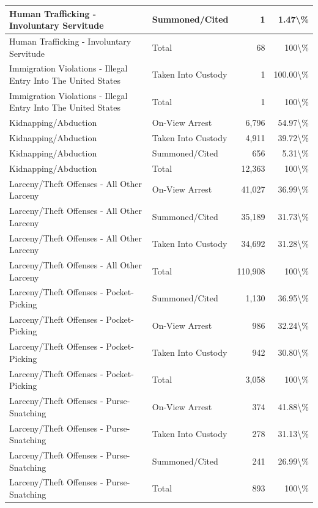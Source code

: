 \documentclass[
]{krantz}
\begin{document}
\begin{longtable}[t]{l|l|r|r}
\hline
Human Trafficking - Involuntary Servitude & Summoned/Cited & 1 & 1.47\textbackslash{}\%\\
\hline
Human Trafficking - Involuntary Servitude & Total & 68 & 100\textbackslash{}\%\\
\hline
Immigration Violations - Illegal Entry Into The United States & Taken Into Custody & 1 & 100.00\textbackslash{}\%\\
\hline
Immigration Violations - Illegal Entry Into The United States & Total & 1 & 100\textbackslash{}\%\\
\hline
Kidnapping/Abduction & On-View Arrest & 6,796 & 54.97\textbackslash{}\%\\
\hline
Kidnapping/Abduction & Taken Into Custody & 4,911 & 39.72\textbackslash{}\%\\
\hline
Kidnapping/Abduction & Summoned/Cited & 656 & 5.31\textbackslash{}\%\\
\hline
Kidnapping/Abduction & Total & 12,363 & 100\textbackslash{}\%\\
\hline
Larceny/Theft Offenses - All Other Larceny & On-View Arrest & 41,027 & 36.99\textbackslash{}\%\\
\hline
Larceny/Theft Offenses - All Other Larceny & Summoned/Cited & 35,189 & 31.73\textbackslash{}\%\\
\hline
Larceny/Theft Offenses - All Other Larceny & Taken Into Custody & 34,692 & 31.28\textbackslash{}\%\\
\hline
Larceny/Theft Offenses - All Other Larceny & Total & 110,908 & 100\textbackslash{}\%\\
\hline
Larceny/Theft Offenses - Pocket-Picking & Summoned/Cited & 1,130 & 36.95\textbackslash{}\%\\
\hline
Larceny/Theft Offenses - Pocket-Picking & On-View Arrest & 986 & 32.24\textbackslash{}\%\\
\hline
Larceny/Theft Offenses - Pocket-Picking & Taken Into Custody & 942 & 30.80\textbackslash{}\%\\
\hline
Larceny/Theft Offenses - Pocket-Picking & Total & 3,058 & 100\textbackslash{}\%\\
\hline
Larceny/Theft Offenses - Purse-Snatching & On-View Arrest & 374 & 41.88\textbackslash{}\%\\
\hline
Larceny/Theft Offenses - Purse-Snatching & Taken Into Custody & 278 & 31.13\textbackslash{}\%\\
\hline
Larceny/Theft Offenses - Purse-Snatching & Summoned/Cited & 241 & 26.99\textbackslash{}\%\\
\hline
Larceny/Theft Offenses - Purse-Snatching & Total & 893 & 100\textbackslash{}\%\\

\end{longtable}
\end{document}
